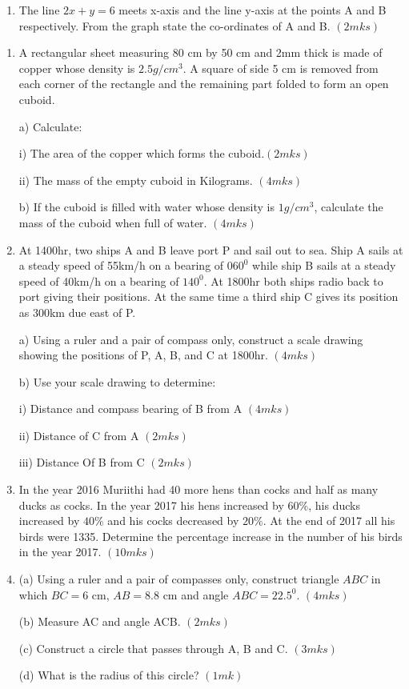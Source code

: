 \documentclass[
  a4paperpaper,
]{scrbook}
\providecommand{\tightlist}{%
  \setlength{\itemsep}{0pt}\setlength{\parskip}{0pt}}\usepackage{longtable,booktabs,array}
\begin{document}
\begin{tcolorbox}
\begin{enumerate}
\def\labelenumi{\alph{enumi})}
\setcounter{enumi}{2}
\tightlist
\item
  The line \(2x+y=6\) meets x-axis and the line y-axis at the points A
  and B respectively. From the graph state the co-ordinates of A and B.
  \((2mks)\)
\end{enumerate}

\begin{enumerate}
\def\labelenumi{\arabic{enumi}.}
\setcounter{enumi}{17}
\item
  A rectangular sheet measuring 80 cm by 50 cm and 2mm thick is made of
  copper whose density is \(2.5 g/cm^3\). A square of side 5 cm is
  removed from each corner of the rectangle and the remaining part
  folded to form an open cuboid.

  a) Calculate:

  i) The area of the copper which forms the cuboid.\((2mks)\)

  ii) The mass of the empty cuboid in Kilograms. \((4mks)\)

  b) If the cuboid is filled with water whose density is \(1 g/cm^3\),
  calculate the mass of the cuboid when full of water. \((4mks)\)
\item
  At 1400hr, two ships A and B leave port P and sail out to sea. Ship A
  sails at a steady speed of 55km/h on a bearing of \(060^0\) while ship
  B sails at a steady speed of 40km/h on a bearing of \(140^0\). At
  1800hr both ships radio back to port giving their positions. At the
  same time a third ship C gives its position as 300km due east of P.

  a) Using a ruler and a pair of compass only, construct a scale drawing
  showing the positions of P, A, B, and C at 1800hr. \((4mks)\)

  b) Use your scale drawing to determine:

  i) Distance and compass bearing of B from A \((4mks)\)

  ii) Distance of C from A \((2mks)\)

  iii) Distance Of B from C \((2mks)\)
\item
  In the year 2016 Muriithi had 40 more hens than cocks and half as many
  ducks as cocks. In the year 2017 his hens increased by \(60\%\), his
  ducks increased by \(40\%\) and his cocks decreased by \(20\%\). At
  the end of 2017 all his birds were 1335. Determine the percentage
  increase in the number of his birds in the year 2017. \((10mks)\)
\item
  (a) Using a ruler and a pair of compasses only, construct triangle
  \(ABC\) in which \(BC=6\) cm, \(AB=8.8\) cm and angle \(ABC=22.5^0\).
  \((4mks)\)

  (b) Measure AC and angle ACB. \((2mks)\)

  (c) Construct a circle that passes through A, B and C. \((3mks)\)

  (d) What is the radius of this circle? \((1mk)\)
\end{enumerate}

\end{tcolorbox}
\end{document}
